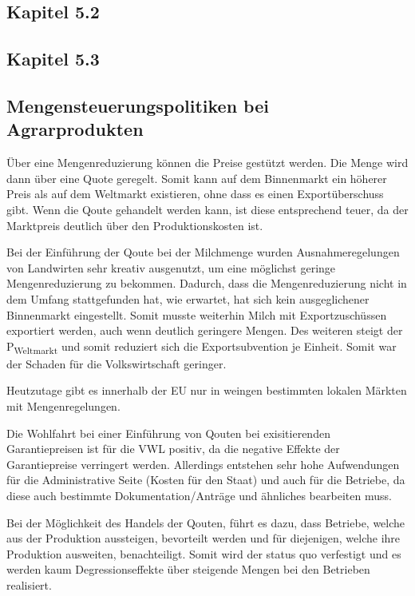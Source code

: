 \documentclass[11pt]{scrbook}
\begin{document}
\subsection{Kapitel 5.2}
\subsection{Kapitel 5.3}
\subsection{Mengensteuerungspolitiken bei Agrarprodukten}

Über eine Mengenreduzierung können die Preise gestützt werden.
Die Menge wird dann über eine Quote geregelt.
Somit kann auf dem Binnenmarkt ein höherer Preis als auf dem Weltmarkt existieren, ohne dass es einen Exportüberschuss gibt.
Wenn die Qoute gehandelt werden kann, ist diese entsprechend teuer, da der Marktpreis deutlich über den Produktionskosten ist.

Bei der Einführung der Qoute bei der Milchmenge wurden Ausnahmeregelungen von Landwirten sehr kreativ ausgenutzt, um eine möglichst geringe Mengenreduzierung zu bekommen.
Dadurch, dass die Mengenreduzierung nicht in dem Umfang stattgefunden hat, wie erwartet, hat sich kein ausgeglichener Binnenmarkt eingestellt.
Somit musste weiterhin Milch mit Exportzuschüssen exportiert werden, auch wenn deutlich geringere Mengen.
Des weiteren steigt der P\textsubscript{Weltmarkt} und somit reduziert sich die Exportsubvention je Einheit.
Somit war der Schaden für die Volkswirtschaft geringer.

Heutzutage gibt es innerhalb der \ac{EU} nur in weingen bestimmten lokalen Märkten mit Mengenregelungen.

Die Wohlfahrt bei einer Einführung von Qouten bei exisitierenden Garantiepreisen ist für die \ac{VWL} positiv, da die negative Effekte der Garantiepreise verringert werden.
Allerdings entstehen sehr hohe Aufwendungen für die Administrative Seite (Kosten für den Staat) und auch für die Betriebe, da diese auch bestimmte Dokumentation/Anträge und ähnliches bearbeiten muss.

Bei der Möglichkeit des Handels der Qouten, führt es dazu, dass Betriebe, welche aus der Produktion aussteigen, bevorteilt werden und für diejenigen, welche ihre Produktion ausweiten, benachteiligt.
Somit wird der status quo verfestigt und es werden kaum Degressionseffekte über steigende Mengen bei den Betrieben realisiert.
\end{document}
